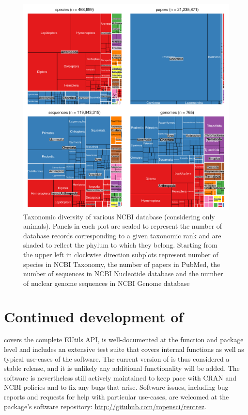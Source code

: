 \begin{figure}
\begin{center}
\includegraphics{Fig1}
\caption{Taxonomic diversity of various NCBI database (considering only
animals). Panels in each plot are scaled to represent the number of database
records corresponding to a given taxonomic rank and are shaded to reflect the
phylum to which they belong. Starting from the upper left in clockwise direction
subplots represent number of species in NCBI Taxonomy, the number of papers 
in PubMed, the number of sequences in NCBI Nucleotide database and the number of 
nuclear genome sequences in NCBI Genome database}
\label{fig:tm}
\end{center}
\end{figure}

\section{Continued development of }

 covers the complete EUtils API, is well-documented at the function
and package level and includes an extensive test suite that covers
internal functions as well as typical use-cases of the software. The current
version of  is thus considered a stable release, and it is
unlikely any additional functionality will be added. The software is nevertheless
still actively maintained to keep pace with CRAN and NCBI policies and to fix
any bugs that arise. Software issues, including bug reports and requests for help 
with particular use-cases, are welcomed at the package's software repository:
\url{http://gituhub.com/ropensci/rentrez}.

